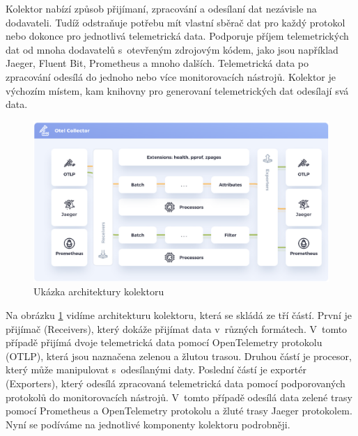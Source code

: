 Kolektor \cite{SignozCollector} nabízí způsob přijímaní, zpracování a odesílaní dat nezávisle na dodavateli. Tudíž odstraňuje potřebu mít vlastní sběrač dat pro každý protokol nebo dokonce pro jednotlivá telemetrická data. Podporuje příjem telemetrických dat od mnoha dodavatelů s~otevřeným zdrojovým kódem, jako jsou například Jaeger, Fluent Bit, Prometheus a mnoho dalších. Telemetrická data po zpracování odesílá do jednoho nebo více monitorovacích nástrojů. Kolektor je výchozím místem, kam knihovny pro generovaní telemetrických dat odesílají svá data.
\begin{figure}[H]
  \centering
  \includegraphics[width=14cm]{obrazky-figures/otel_collector.png}
  \caption{Ukázka architektury kolektoru\protect\footnotemark}
  \label{fig:collector}
\end{figure}
Na obrázku \ref{fig:collector} vidíme architekturu kolektoru, která se skládá ze tří částí. První je přijímač (Receivers), který dokáže přijímat data v~různých formátech. V~tomto případě přijímá dvoje telemetrická data pomocí OpenTelemetry protokolu (OTLP), která jsou naznačena zelenou a žlutou trasou. Druhou částí je procesor, který může manipulovat s~odesílanými daty. Poslední částí je exportér (Exporters), který odesílá zpracovaná telemetrická data pomocí podporovaných protokolů do monitorovacích nástrojů. V~tomto případě odesílá data zelené trasy pomocí Prometheus a OpenTelemetry protokolu a žluté trasy Jaeger protokolem. Nyní se podíváme na jednotlivé komponenty kolektoru podrobněji.
